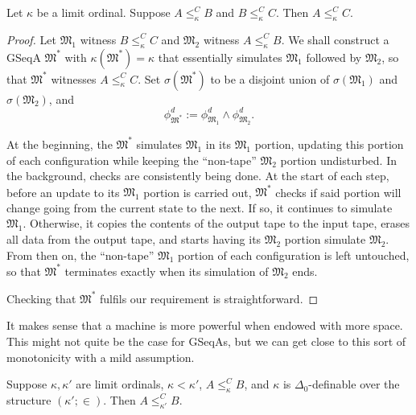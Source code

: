 \documentclass[12pt]{article}
\numberwithin{equation}{section}
\begin{document}
\begin{prop}\label{prop245}
Let $\kappa$ be a limit ordinal. Suppose $A \leq^C_{\kappa} B$ and $B \leq^C_{\kappa} C$. Then $A \leq^C_{\kappa} C$.
\end{prop}

\begin{proof}
Let $\mathfrak{M}_1$ witness $B \leq^C_{\kappa} C$ and $\mathfrak{M}_2$ witness $A \leq^C_{\kappa} B$. We shall construct a GSeqA $\mathfrak{M}^*$ with $\kappa(\mathfrak{M}^*) = \kappa$ that essentially simulates $\mathfrak{M}_1$ followed by $\mathfrak{M}_2$, so that $\mathfrak{M}^*$ witnesses $A \leq^C_{\kappa} C$. Set $\sigma(\mathfrak{M}^*)$ to be a disjoint union of $\sigma(\mathfrak{M}_1)$ and $\sigma(\mathfrak{M}_2)$, and 
\begin{equation*}
    \phi^d_{\mathfrak{M}^*} := \phi^d_{\mathfrak{M}_1} \wedge \phi^d_{\mathfrak{M}_2} \text{.}
\end{equation*}

At the beginning, the $\mathfrak{M}^*$ simulates $\mathfrak{M}_1$ in its $\mathfrak{M}_1$ portion, updating this portion of each configuration while keeping the ``non-tape'' $\mathfrak{M}_2$ portion undisturbed. In the background, checks are consistently being done. At the start of each step, before an update to its $\mathfrak{M}_1$ portion is carried out, $\mathfrak{M}^*$ checks if said portion will change going from the current state to the next. If so, it continues to simulate $\mathfrak{M}_1$. Otherwise, it copies the contents of the output tape to the input tape, erases all data from the output tape, and starts having its $\mathfrak{M}_2$ portion simulate $\mathfrak{M}_2$. From then on, the ``non-tape'' $\mathfrak{M}_1$ portion of each configuration is left untouched, so that $\mathfrak{M}^*$ terminates exactly when its simulation of $\mathfrak{M}_2$ ends.

Checking that $\mathfrak{M}^*$ fulfils our requirement is straightforward.
\end{proof}

It makes sense that a machine is more powerful when endowed with more space. This might not quite be the case for GSeqAs, but we can get close to this sort of monotonicity with a mild assumption.

\begin{prop}\label{prop246}
Suppose $\kappa, \kappa'$ are limit ordinals, $\kappa < \kappa'$, $A \leq^C_{\kappa} B$, and $\kappa$ is $\Delta_0$-definable over the structure $(\kappa'; \in)$. Then $A \leq^C_{\kappa'} B$.
\end{prop}
\end{document}
